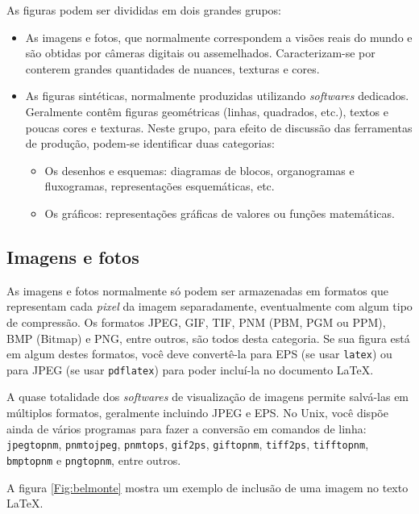 As figuras podem ser divididas em dois grandes grupos:
\begin{itemize}
\item As imagens e fotos, que normalmente correspondem a visões reais
do mundo e são obtidas por câmeras digitais ou
assemelhados. Caracterizam-se por conterem grandes quantidades de
nuances, texturas e cores.
\item As figuras sintéticas, normalmente produzidas utilizando
\emph{softwares} dedicados. Geralmente contêm figuras geométricas
(linhas, quadrados, etc.), textos e poucas cores e texturas. Neste
grupo, para efeito de discussão das ferramentas de produção, podem-se
identificar duas categorias:
\begin{itemize}
\item Os desenhos e esquemas: diagramas de blocos, organogramas e
fluxogramas, representações esquemáticas, etc.
\item Os gráficos: representações gráficas de valores ou funções
matemáticas.
\end{itemize}
\end{itemize}

\subsection{Imagens e fotos}
\label{Sec:imagens}

As imagens e fotos normalmente só podem ser armazenadas em formatos
que representam cada \emph{pixel} da imagem separadamente,
eventualmente com algum tipo de compressão. Os formatos JPEG, GIF,
TIF, PNM (PBM, PGM ou PPM), BMP (Bitmap) e PNG, entre outros, são
todos desta categoria.  Se sua figura está em algum destes formatos,
você deve convertê-la para EPS (se usar \texttt{latex}) ou para JPEG
(se usar \texttt{pdflatex}) para poder incluí-la no documento \LaTeX.

A quase totalidade dos \emph{softwares} de visualização de imagens
permite salvá-las em múltiplos formatos, geralmente incluindo JPEG e
EPS. No Unix, você dispõe ainda de vários programas para fazer a
conversão em comandos de linha: \texttt{jpegtopnm},
\texttt{pnmtojpeg}, \texttt{pnmtops}, \texttt{gif2ps},
\texttt{giftopnm}, \texttt{tiff2ps}, \texttt{tifftopnm},
\texttt{bmptopnm} e \texttt{pngtopnm}, entre outros.

A figura \ref{Fig:belmonte} mostra um exemplo de inclusão de uma
imagem no texto \LaTeX.

